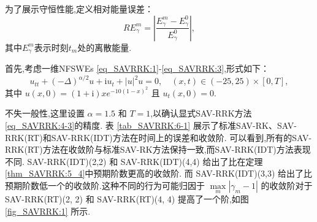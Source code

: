 为了展示守恒性能,定义相对能量误差：
\begin{equation}\label{eq_SAVRRK:105}
	R E_{\gamma}^{m} = \left|\frac{E_{\gamma}^{m} - E_{\gamma}^{0}}{E_{\gamma}^{0}}\right|,
\end{equation}
其中$E_{\gamma}^{m}$表示时刻$t_m$处的离散能量.

\begin{example}\label{exp_SAVRRK:1}
	\cite{ranLinearlyImplicitConservative2016} 
	首先,考虑一维NFSWEs \eqref{eq_SAVRRK:1}-\eqref{eq_SAVRRK:3},形式如下：
	\begin{equation}\label{eq_SAVRRK:108}
		u_{t t}+(-\Delta)^{\alpha / 2} u+\mathrm{i}u_t+|u|^2 u=0, \quad (x,t)\in  (-25, 25)\times[0, T],
	\end{equation}
	其中 $u(x, 0)=(1+\mathrm{i}) x e^{-10(1-x)^2}$ 且 $u_t(x, 0)=0$.
	\end{example}
		
	
		
	不失一般性,这里设置 $\alpha=1.5$ 和 $T=1$,以确认显式SAV-RRK方法\eqref{eq_SAVRRK:4-3}的精度.
	表 \ref{tab_SAVRRK:6-1} 展示了标准SAV-RK、SAV-RRK(RT)和SAV-RRK(IDT)方法在时间上的误差和收敛阶.
	可以看到,所有的SAV-RRK(RT)方法在收敛阶与标准SAV-RK方法保持一致,而SAV-RRK(IDT)方法表现不同.
	SAV-RRK(IDT)(2,2) 和 SAV-RRK(IDT)(4,4) 给出了比在定理\ref{thm_SAVRRK:5_4}中预期阶数更高的收敛阶.
	而 SAV-RRK(IDT)(3,3) 给出了比预期阶数低一个的收敛阶.这种不同的行为可能归因于 $\max\limits _m\left|\gamma_m-1\right|$ 
	的收敛阶对于 SAV-RRK(RT)(2, 2) 和 SAV-RRK(RT)(4, 4) 提高了一个阶,如图 \ref{fig_SAVRRK:1} 所示.


